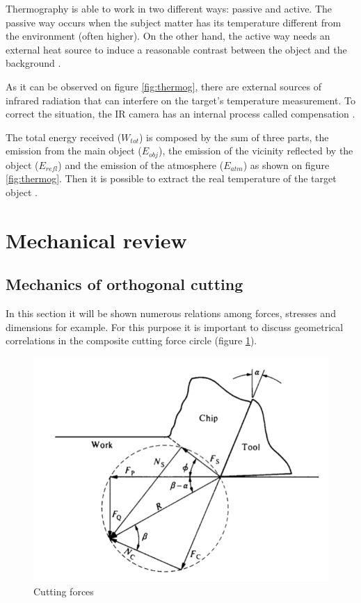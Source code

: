 	Thermography is able to work in two different ways: passive and active. The passive way occurs when the subject matter has its temperature different from the environment (often higher). On the other hand, the active way needs an external heat source to induce a reasonable contrast between the object and the background \cite{maldague2000}.

	As it can be observed on figure \ref{fig:thermog}, there are external sources of infrared radiation that can interfere on the target's temperature measurement. To correct the situation, the IR camera has an internal process called compensation \cite{usamentiaga2014}.

	The total energy received ($W_{tot}$) is composed by the sum of three parts, the emission from the main object ($E_{obj}$), the emission of the vicinity reflected by the object ($E_{refl}$) and the emission of the atmosphere ($E_{atm}$) as shown on figure \ref{fig:thermog}. Then it is possible to extract the real temperature of the target object \cite{usamentiaga2014}.


\section{Mechanical review}
	\subsection{Mechanics of orthogonal cutting}

	In this section it will be shown numerous relations among forces, stresses and dimensions for example. For this purpose it is important to discuss geometrical correlations in the composite cutting force circle (figure \ref{fig:circlec}).

	\begin{figure}[h]
		\centering
		\captionsetup{justification=centering}
		\includegraphics[scale=0.5]{Cap1/circlec.png}
		\caption{Cutting forces \cite{shaw2005metal}}
		\label{fig:circlec}
	\end{figure}

